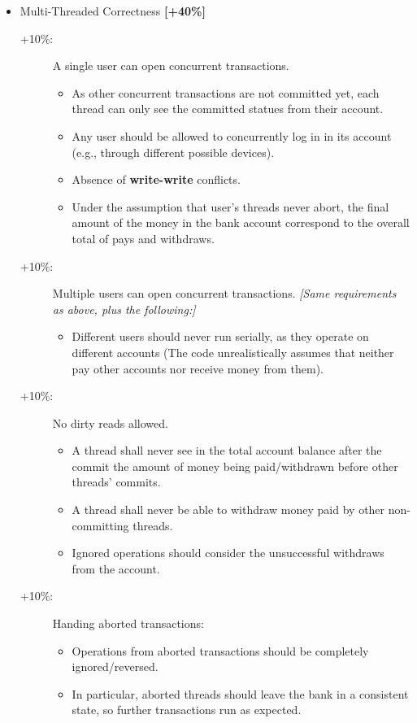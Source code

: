 \documentclass{article}
\begin{document}
\begin{itemize}
	\item  Multi-Threaded Correctness \textbf{[+40\%]}
\begin{description}
	\item [+10\%:] A single user can open concurrent transactions.
	\begin{itemize}
		\item As other concurrent transactions are not committed yet, each thread can only see the committed statues from their account.
		\item Any user should be allowed to concurrently log in in its account (e.g., through different possible devices).
		\item Absence of \textbf{write-write} conflicts.
		\item Under the assumption that user's threads never abort, the final amount of the money in the bank account correspond to the overall total of pays and withdraws.
	\end{itemize}
	\item [+10\%:] Multiple users can open concurrent transactions. \textit{[Same requirements as above, plus the following:]}
\begin{itemize}
	\item Different users should never run serially, as they operate on different accounts (The code unrealistically assumes that neither  pay other accounts nor receive money from them).
\end{itemize}
\item [+10\%:] No dirty reads allowed.
\begin{itemize}
	\item A thread shall never see in the total account balance after the commit the amount of money being paid/withdrawn before other threads' commits.
	\item A thread shall never be able to withdraw money paid by other non-committing threads. 
	\item Ignored operations should consider the unsuccessful withdraws from the account.
\end{itemize} 
\item [+10\%:] Handing aborted transactions:
\begin{itemize}
	\item Operations from aborted transactions should be completely ignored/reversed.
	\item In particular, aborted threads should leave the bank in a consistent state, so further transactions run as expected.
\end{itemize}
\end{description}



\end{itemize}
\end{document}
